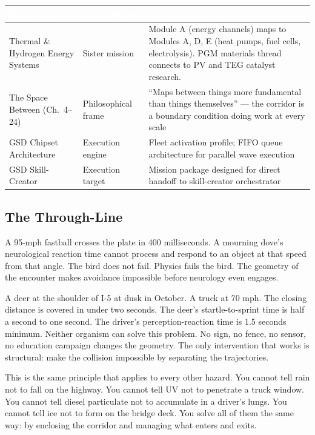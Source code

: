 \documentclass[11pt,letterpaper]{article}
\newcommand{\tableheader}[1]{\textbf{\sffamily\textcolor{white}{#1}}}
\begin{document}
\begin{center}
\begin{tabularx}{\textwidth}{L{4.5cm}L{3.5cm}X}
\toprule
{}
\tableheader{Document} & \tableheader{Relationship} & \tableheader{Connection Point} \\
\midrule
Thermal \& Hydrogen Energy Systems & Sister mission & Module A (energy channels) maps to Modules A, D, E (heat pumps, fuel cells, electrolysis). PGM materials thread connects to PV and TEG catalyst research. \\
The Space Between (Ch.~4--24) & Philosophical frame & ``Maps between things more fundamental than things themselves'' --- the corridor is a boundary condition doing work at every scale \\
GSD Chipset Architecture & Execution engine & Fleet activation profile; FIFO queue architecture for parallel wave execution \\
GSD Skill-Creator & Execution target & Mission package designed for direct handoff to skill-creator orchestrator \\
\bottomrule
\end{tabularx}
\end{center}

\subsection{The Through-Line}

A 95-mph fastball crosses the plate in 400 milliseconds. A mourning dove's neurological reaction time cannot process and respond to an object at that speed from that angle. The bird does not fail. Physics fails the bird. The geometry of the encounter makes avoidance impossible before neurology even engages.

A deer at the shoulder of I-5 at dusk in October. A truck at 70 mph. The closing distance is covered in under two seconds. The deer's startle-to-sprint time is half a second to one second. The driver's perception-reaction time is 1.5 seconds minimum. Neither organism can solve this problem. No sign, no fence, no sensor, no education campaign changes the geometry. The only intervention that works is structural: make the collision impossible by separating the trajectories.

This is the same principle that applies to every other hazard. You cannot tell rain not to fall on the highway. You cannot tell UV not to penetrate a truck window. You cannot tell diesel particulate not to accumulate in a driver's lungs. You cannot tell ice not to form on the bridge deck. You solve all of them the same way: by enclosing the corridor and managing what enters and exits.
\end{document}
